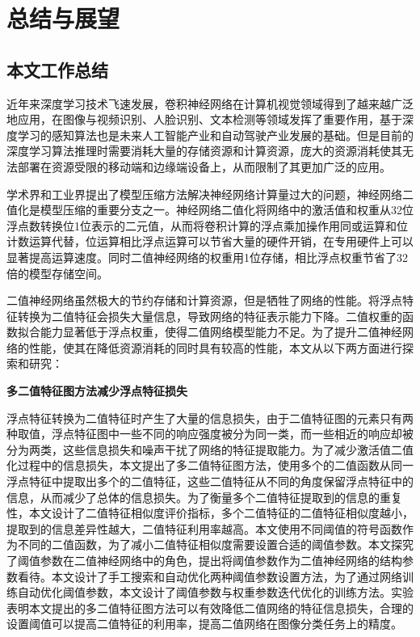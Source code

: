 
\chapter{总结与展望}

\section{本文工作总结}

近年来深度学习技术飞速发展，卷积神经网络在计算机视觉领域得到了越来越广泛地应用，在图像与视频识别、人脸识别、文本检测等领域发挥了重要作用，基于深度学习的感知算法也是未来人工智能产业和自动驾驶产业发展的基础。但是目前的深度学习算法推理时需要消耗大量的存储资源和计算资源，庞大的资源消耗使其无法部署在资源受限的移动端和边缘端设备上，从而限制了其更加广泛的应用。

学术界和工业界提出了模型压缩方法解决神经网络计算量过大的问题，神经网络二值化是模型压缩的重要分支之一。神经网络二值化将网络中的激活值和权重从32位浮点数转换位1位表示的二元值，从而将卷积计算的浮点乘加操作用同或运算和位计数运算代替，位运算相比浮点运算可以节省大量的硬件开销，在专用硬件上可以显著提高运算速度。同时二值神经网络的权重用1位存储，相比浮点权重节省了32倍的模型存储空间。

二值神经网络虽然极大的节约存储和计算资源，但是牺牲了网络的性能。将浮点特征转换为二值特征会损失大量信息，导致网络的特征表示能力下降。二值权重的函数拟合能力显著低于浮点权重，使得二值网络模型能力不足。为了提升二值神经网络的性能，使其在降低资源消耗的同时具有较高的性能，本文从以下两方面进行探索和研究：

\textbf{多二值特征图方法减少浮点特征损失}

浮点特征转换为二值特征时产生了大量的信息损失，由于二值特征图的元素只有两种取值，浮点特征图中一些不同的响应强度被分为同一类，而一些相近的响应却被分为两类，这些信息损失和噪声干扰了网络的特征提取能力。为了减少激活值二值化过程中的信息损失，本文提出了多二值特征图方法，使用多个的二值函数从同一浮点特征中提取出多个的二值特征，这些二值特征从不同的角度保留浮点特征中的信息，从而减少了总体的信息损失。为了衡量多个二值特征提取到的信息的重复性，本文设计了二值特征相似度评价指标，多个二值特征的二值特征相似度越小，提取到的信息差异性越大，二值特征利用率越高。本文使用不同阈值的符号函数作为不同的二值函数，为了减小二值特征相似度需要设置合适的阈值参数。本文探究了阈值参数在二值神经网络中的角色，提出将阈值参数作为二值神经网络的结构参数看待。本文设计了手工搜索和自动优化两种阈值参数设置方法，为了通过网络训练自动优化阈值参数，本文设计了阈值参数与权重参数迭代优化的训练方法。实验表明本文提出的多二值特征图方法可以有效降低二值网络的特征信息损失，合理的设置阈值可以提高二值特征的利用率，提高二值网络在图像分类任务上的精度。

